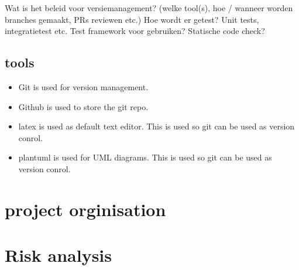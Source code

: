 \documentclass{article} %
\begin{document}
Wat is het beleid voor versiemanagement? (welke tool(s), hoe / wanneer worden branches gemaakt, PRs reviewen etc.)
Hoe wordt er getest? Unit tests, integratietest etc. Test framework voor gebruiken? Statische code check?
\subsection{tools}
\begin{itemize}
    \item Git is used for version management.
    \item Github is used to store the git repo.
    \item latex is used as default text editor. This is used so git can be used as version conrol.
    \item plantuml is used for UML diagrams. This is used so git can be used as version conrol.

\end{itemize}
\newpage

\section{project orginisation}
\newpage

\section{Risk analysis}
\newpage
\end{document}
